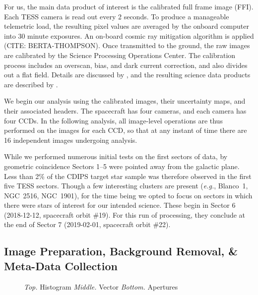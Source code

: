 \documentclass[12pt,twocolumn,tighten]{aastex62}
\begin{document}
For us, the main data product of interest is the calibrated full frame
image (FFI).  Each TESS camera is read out every 2 seconds.  To produce
a manageable telemetric load, the resulting pixel values are averaged
by the onboard computer into 30 minute exposures. An on-board cosmic
ray mitigation algorithm is applied (CITE: BERTA-THOMPSON). Once
transmitted to the ground, the raw images are calibrated by the
Science Processing Operations Center.  The calibration process
includes an overscan, bias, and dark current correction, and also
divides out a flat field.  Details are discussed by
\citet{clarke_kepler_2017}, and the resulting science data products
are described by \citet{tess_data_product_description_2018}.

We begin our analysis using the calibrated images, their uncertainty
maps, and their associated headers.  The spacecraft has four cameras,
and each camera has four CCDs.  In the following analysis, all
image-level operations are thus performed on the images for each CCD,
so that at any instant of time there are 16 independent images
undergoing analysis.

While we performed numerous initial tests on the first sectors of data,
by geometric coincidence Sectors 1--5 were pointed away from the galactic plane.
Less than 2\% of the CDIPS target star sample
was therefore observed in the first five TESS sectors.
Though a few interesting clusters are present ({\it e.g.}, Blanco~1, NGC~2516, NGC~1901),
for the time being we opted to focus on sectors in which there were stars
of interest for our intended science.
These begin in Sector 6 (2018-12-12, spacecraft orbit \#19).
For this run of processing, they conclude at the end of Sector 7
(2019-02-01, spacecraft orbit \#22).

\subsection{Image Preparation, Background Removal, \& Meta-Data Collection}
\label{subsec:preparation}


\begin{figure}[!ht]
	\vspace{-0.8cm}
	\vspace{-0.8cm}
	\caption{
		{\it Top.} Histogram
		{\it Middle.} Vector
		{\it Bottom.} Apertures
	}
	\label{fig:astromresid}
\end{figure}
\end{document}
